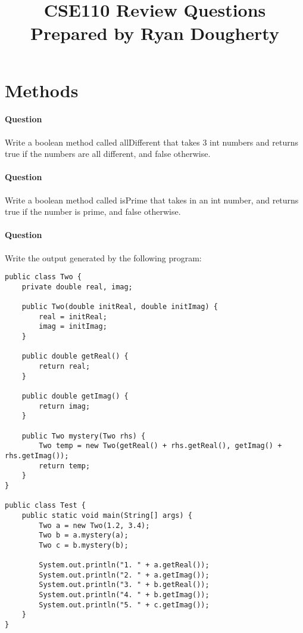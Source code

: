 \documentclass{article}
\date{}
\begin{document}
\title{\textbf{CSE110 Review Questions \\
Prepared by Ryan Dougherty}}
\maketitle

\section*{Methods}


\setcounter{question_num}{1}
\paragraph{Question }
Write a boolean method called allDifferent that takes 3 int numbers and returns true if the numbers are all different, and false otherwise.

\addtocounter{question_num}{1}
\paragraph{Question }
Write a boolean method called isPrime that takes in an int number, and returns true if the number is prime, and false otherwise.

\addtocounter{question_num}{1}
\paragraph{Question }
Write the output generated by the following program:
\begin{lstlisting}
public class Two {
	private double real, imag;

	public Two(double initReal, double initImag) {
		real = initReal;
		imag = initImag;
	}

	public double getReal() {
		return real;
	}

	public double getImag() {
		return imag;
	}

	public Two mystery(Two rhs) {
		Two temp = new Two(getReal() + rhs.getReal(), getImag() + rhs.getImag());
		return temp;
	}
}

public class Test {
	public static void main(String[] args) {
		Two a = new Two(1.2, 3.4);
		Two b = a.mystery(a);
		Two c = b.mystery(b);

		System.out.println("1. " + a.getReal());
		System.out.println("2. " + a.getImag());
		System.out.println("3. " + b.getReal());
		System.out.println("4. " + b.getImag());
		System.out.println("5. " + c.getImag());
	}
}
\end{lstlisting}
\end{document}
